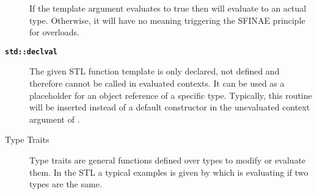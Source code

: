 \documentclass{stdlocal}
\begin{document}
\begin{description}
        If the template argument evaluates to true then  will evaluate to an actual type.
        Otherwise, it will have no meaning triggering the SFINAE principle for overloads.
      \item[\texttt{\textbf{\footnotesize std::declval}}]
        The given STL function template is only declared, not defined and therefore cannot be called in evaluated contexts.
        It can be used as a placeholder for an object reference of a specific type.
        Typically, this routine will be inserted instead of a default constructor in the unevaluated context argument of .
      \item[Type Traits]
        Type traits are general functions defined over types to modify or evaluate them.
        In the STL a typical examples is given by  which is evaluating if two types are the same.
    \end{description}
\end{document}
